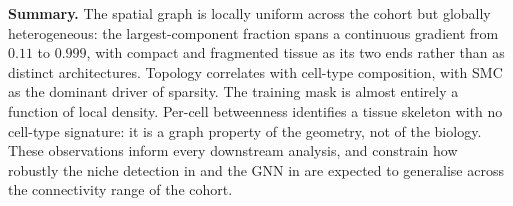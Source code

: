 \medskip

\noindent\textbf{Summary.} The spatial graph is locally uniform across the cohort but globally heterogeneous: the largest-component fraction spans a continuous gradient from $0.11$ to $0.999$, with compact and fragmented tissue as its two ends rather than as distinct architectures. Topology correlates with cell-type composition, with SMC as the dominant driver of sparsity. The training mask is almost entirely a function of local density. Per-cell betweenness identifies a tissue skeleton with no cell-type signature: it is a graph property of the geometry, not of the biology. These observations inform every downstream analysis, and constrain how robustly the niche detection in  and the GNN in  are expected to generalise across the connectivity range of the cohort.